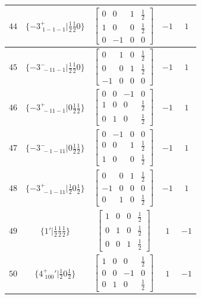 \documentclass[fleqn,8pt]{jsarticle}
\begin{document}
\begin{longtable}{ccccc}
$ 44 $ & $ \{-3^{+}_{\,\,1-1-1}|\frac{1}{2} \frac{1}{2} 0\} $ & $ \begin{bmatrix} 0 & 0 & 1 & \frac{1}{2} \\ 1 & 0 & 0 & \frac{1}{2} \\ 0 & -1 & 0 & 0 \end{bmatrix} $ & $ -1 $ & $ 1 $ \\ \hline
$ 45 $ & $ \{-3^{-}_{\,\,-11-1}|\frac{1}{2} \frac{1}{2} 0\} $ & $ \begin{bmatrix} 0 & 1 & 0 & \frac{1}{2} \\ 0 & 0 & 1 & \frac{1}{2} \\ -1 & 0 & 0 & 0 \end{bmatrix} $ & $ -1 $ & $ 1 $ \\ \hline
$ 46 $ & $ \{-3^{+}_{\,\,-11-1}|0 \frac{1}{2} \frac{1}{2}\} $ & $ \begin{bmatrix} 0 & 0 & -1 & 0 \\ 1 & 0 & 0 & \frac{1}{2} \\ 0 & 1 & 0 & \frac{1}{2} \end{bmatrix} $ & $ -1 $ & $ 1 $ \\ \hline
$ 47 $ & $ \{-3^{-}_{\,\,-1-11}|0 \frac{1}{2} \frac{1}{2}\} $ & $ \begin{bmatrix} 0 & -1 & 0 & 0 \\ 0 & 0 & 1 & \frac{1}{2} \\ 1 & 0 & 0 & \frac{1}{2} \end{bmatrix} $ & $ -1 $ & $ 1 $ \\ \hline
$ 48 $ & $ \{-3^{+}_{\,\,-1-11}|\frac{1}{2} 0 \frac{1}{2}\} $ & $ \begin{bmatrix} 0 & 0 & 1 & \frac{1}{2} \\ -1 & 0 & 0 & 0 \\ 0 & 1 & 0 & \frac{1}{2} \end{bmatrix} $ & $ -1 $ & $ 1 $ \\ \hline
$ 49 $ & $ \{1{}'|\frac{1}{2} \frac{1}{2} \frac{1}{2}\} $ & $ \begin{bmatrix} 1 & 0 & 0 & \frac{1}{2} \\ 0 & 1 & 0 & \frac{1}{2} \\ 0 & 0 & 1 & \frac{1}{2} \end{bmatrix} $ & $ 1 $ & $ -1 $ \\ \hline
$ 50 $ & $ \{4^{+}_{\,\,100}{}'|\frac{1}{2} 0 \frac{1}{2}\} $ & $ \begin{bmatrix} 1 & 0 & 0 & \frac{1}{2} \\ 0 & 0 & -1 & 0 \\ 0 & 1 & 0 & \frac{1}{2} \end{bmatrix} $ & $ 1 $ & $ -1 $ \\ \hline

\end{longtable}
\end{document}
